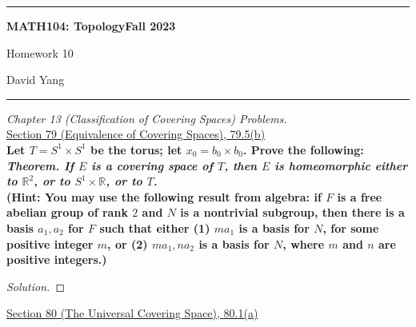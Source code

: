 \documentclass[11pt]{article}
\newcommand{\R}{\mathbb{R}}
\newenvironment{solution}
  {\renewcommand\qedsymbol{$\blacksquare$}\begin{proof}[Solution]}
  {\end{proof}}
\begin{document}
	\hrule
	\begin{center}
        \textbf{MATH104: Topology}\hfill \textbf{Fall 2023}\newline

		{\Large Homework 10}

		David Yang
	\end{center}

\hrule

\vspace{1em}

\textit{Chapter 13 (Classification of Covering Spaces) Problems.} \\

\underline{Section 79 (Equivalence of Covering Spaces), 79.5(b)} \\

\textbf{Let $T = S^1 \times S^1$ be the torus; let $x_0 = b_0 \times b_0$. Prove the following:} \\

\textbf{\textit{Theorem. If $E$ is a covering space of $T$, then $E$ is homeomorphic either to $\R^2$, or to $S^1 \times \R$, or to $T$.}} \\

\textbf{(Hint: You may use the following result from algebra: if $F$ is a free abelian group of rank $2$ and $N$ is a nontrivial subgroup, then there is a basis $a_1, a_2$ for $F$ 
such that either (1) $ma_1$ is a basis for $N$, for some positive integer $m$,
or (2) $ma_1, na_2$ is a basis for $N$, where $m$ and $n$ are positive integers.)}

\begin{solution}

\end{solution}

\newpage

\underline{Section 80 (The Universal Covering Space), 80.1(a)} \\
\end{document}

